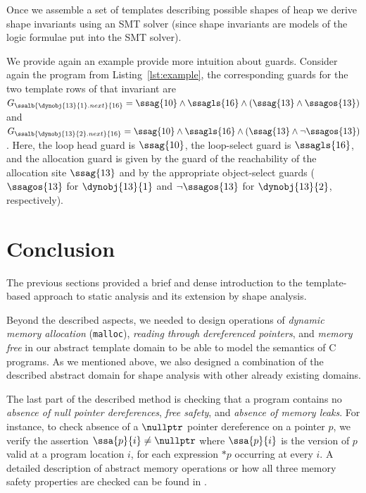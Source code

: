 {Once we assemble a set of templates describing possible shapes of heap we derive shape invariants
using an SMT solver (since shape invariants are models of the logic formulae put into
the SMT solver).

We provide again an example provide more intuition about guards.
Consider again the program from Listing~\ref{lst:example},
the corresponding guards for the two template rows of that invariant are
$G_{\ssalb{\dynobj{13}{1}.next}{16}} = \ssag{10} \wedge \ssagls{16} \wedge
(\ssag{13} \wedge \ssagos{13})$ and $G_{\ssalb{\dynobj{13}{2}.next}{16}} =
\ssag{10} \wedge \ssagls{16} \wedge (\ssag{13} \wedge \neg \ssagos{13})$.
%
Here, the loop head guard is $\ssag{10}$, the loop-select guard is
$\ssagls{16}$, and the allocation guard is given by the guard of the
reachability of the allocation site $\ssag{13}$ and by the appropriate
object-select guards ($\ssagos{13}$ for $\dynobj{13}{1}$ and $\neg \ssagos{13}$
for $\dynobj{13}{2}$, respectively).



\section{Conclusion}
The previous sections provided a brief and dense introduction to the template-based
approach to static analysis and its extension by shape analysis.

Beyond the described aspects, we needed to design operations of \emph{dynamic memory allocation}
(\texttt{malloc}), \emph{reading through dereferenced pointers}, and \emph{memory free} in
our abstract template domain to be able to model the semantics of C programs.
As we mentioned above, we also designed a combination of the described abstract domain
for shape analysis with other already existing domains.

The last part of the described method is checking that
a program contains no \emph{absence of null pointer dereferences},
\emph{free safety}, and \emph{absence of memory leaks}.
For instance, to check absence of a $\nullptr$ pointer dereference on a pointer $p$, we verify the assertion
$\ssa{p}{i} \neq \nullptr$ where $\ssa{p}{i}$ is the version of $p$
valid at a program location $i$, for each expression $*p$ occurring at every $i$.
A detailed description of abstract memory operations or how all three memory safety properties are checked
can be found in \cite{fmcad18}.

}
